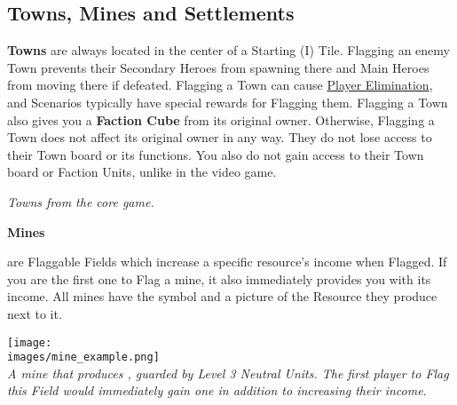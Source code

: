 \begin{multicols*}{2}
\vspace*{\fill}

\vspace{7.4em}


\vspace*{\fill}

\pagebreak

\subsection*{Towns, Mines and Settlements}
\textbf{Towns} are always located in the center of a Starting (I) Tile.
Flagging an enemy Town prevents their Secondary Heroes from spawning there and Main Heroes from moving there if defeated.
Flagging a Town can cause \hyperlink{End}{Player Elimination}, and Scenarios typically have special rewards for Flagging them.
Flagging a Town also gives you a \textbf{Faction Cube} from its original owner.
Otherwise, Flagging a Town does not affect its original owner in any way.
They do not lose access to their Town board or its functions.
You also do not gain access to their Town board or Faction Units, unlike in the video game.

\begin{center}
  \textit{Towns from the core game.}
\end{center}

\medskip

\hypertarget{Mines}{\textbf{Mines}} are Flaggable Fields which increase a specific resource's income when Flagged.
If you are the first one to Flag a mine, it also immediately provides you with its income.
All mines have the  symbol and a picture of the Resource they produce next to it.

\begin{center}
  \texttt{[image: \\images/mine\_example.png]}\\
  \textit{A mine that produces , guarded by Level 3 Neutral Units.
    The first player to Flag this Field would immediately gain one  in addition to increasing their  income.
  }
\end{center}
\columnbreak


\end{multicols*}
